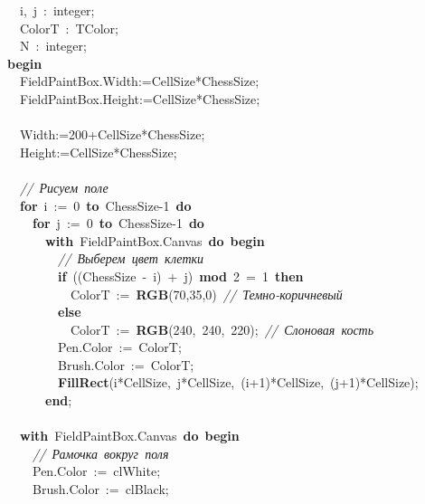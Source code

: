 \mbox{}\ \ i,\ j\ :\ integer; \\
\mbox{}\ \ ColorT\ :\ TColor; \\
\mbox{}\ \ N\ :\ integer; \\
\mbox{}\textbf{begin} \\
\mbox{}\ \ FieldPaintBox.Width:=CellSize*ChessSize; \\
\mbox{}\ \ FieldPaintBox.Height:=CellSize*ChessSize; \\
\mbox{} \\
\mbox{}\ \ Width:=200+CellSize*ChessSize; \\
\mbox{}\ \ Height:=CellSize*ChessSize; \\
\mbox{} \\
\mbox{}\ \ \textit{//\ Рисуем\ поле} \\
\mbox{}\ \ \textbf{for}\ i\ :=\ 0\ \textbf{to}\ ChessSize-1\ \textbf{do} \\
\mbox{}\ \ \ \ \textbf{for}\ j\ :=\ 0\ \textbf{to}\ ChessSize-1\ \textbf{do} \\
\mbox{}\ \ \ \ \ \ \textbf{with}\ FieldPaintBox.Canvas\ \textbf{do}\ \textbf{begin} \\
\mbox{}\ \ \ \ \ \ \ \ \textit{//\ Выберем\ цвет\ клетки} \\
\mbox{}\ \ \ \ \ \ \ \ \textbf{if}\ ((ChessSize\ -\ i)\ +\ j)\ \textbf{mod}\ 2\ =\ 1\ \textbf{then} \\
\mbox{}\ \ \ \ \ \ \ \ \ \ ColorT\ :=\ \textbf{RGB}(70,35,0)\ \textit{//\ Темно-коричневый} \\
\mbox{}\ \ \ \ \ \ \ \ \textbf{else} \\
\mbox{}\ \ \ \ \ \ \ \ \ \ ColorT\ :=\ \textbf{RGB}(240,\ 240,\ 220);\ \textit{//\ Слоновая\ кость} \\
\mbox{}\ \ \ \ \ \ \ \ Pen.Color\ :=\ ColorT; \\
\mbox{}\ \ \ \ \ \ \ \ Brush.Color\ :=\ ColorT; \\
\mbox{}\ \ \ \ \ \ \ \ \textbf{FillRect}(i*CellSize,\ j*CellSize,\ (i+1)*CellSize,\ (j+1)*CellSize); \\
\mbox{}\ \ \ \ \ \ \textbf{end}; \\
\mbox{} \\
\mbox{}\ \ \textbf{with}\ FieldPaintBox.Canvas\ \textbf{do}\ \textbf{begin} \\
\mbox{}\ \ \ \ \textit{//\ Рамочка\ вокруг\ поля} \\
\mbox{}\ \ \ \ Pen.Color\ :=\ clWhite; \\
\mbox{}\ \ \ \ Brush.Color\ :=\ clBlack; \\
